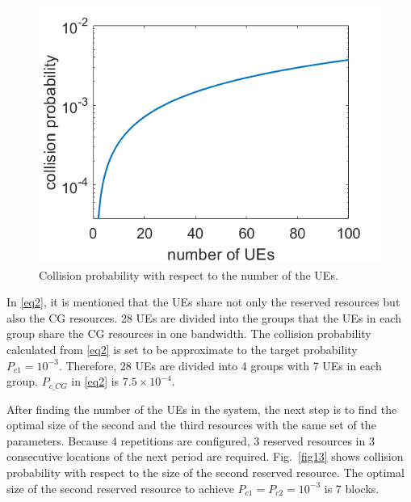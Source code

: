 \documentclass{ieeeaccess}
\begin{document}
\begin{figure}[htbp]
\centerline{\includegraphics[scale=0.35]{fig12.png}}
\caption{Collision probability with respect to the number of the UEs.}
\vspace{-2mm}
\label{fig12}

\end{figure}


In \eqref{eq2}, it is mentioned that the UEs share not only the reserved resources but also the CG resources. 28 UEs are divided into the groups that the UEs in each group share the CG resources in one bandwidth. The collision probability calculated from \eqref{eq2} is set to be approximate to the target probability $P_{c1}=10^{-3}$. Therefore, 28 UEs are divided into 4 groups with 7 UEs in each group. $P_{c\_CG}$ in \eqref{eq2} is $7.5\times10^{-4}$.


After finding the number of the UEs in the system, the next step is to find the optimal size of the second and the third resources with the same set of the parameters. Because 4 repetitions are configured, 3 reserved resources in 3 consecutive locations of the next period are required. Fig.~\ref{fig13} shows collision probability with respect to the size of the second reserved resource. The optimal size of the second reserved resource to achieve $P_{c1} = P_{c2} = 10^{-3}$ is 7 blocks.
\end{document}
